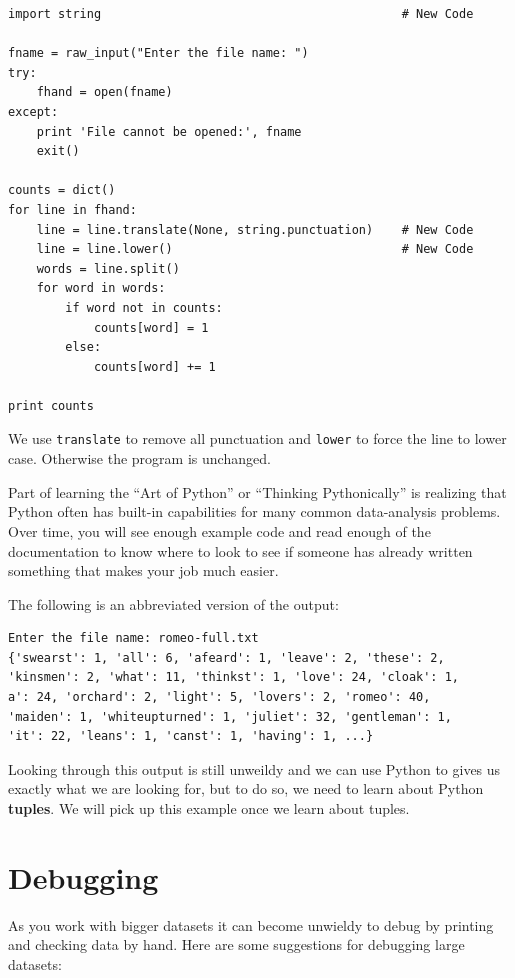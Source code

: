 \documentclass[10pt]{book}
\begin{document}
\beforeverb
\begin{verbatim}
import string                                          # New Code

fname = raw_input("Enter the file name: ")
try:
    fhand = open(fname)
except:
    print 'File cannot be opened:', fname
    exit()

counts = dict()
for line in fhand:
    line = line.translate(None, string.punctuation)    # New Code
    line = line.lower()                                # New Code
    words = line.split()
    for word in words:
        if word not in counts:
            counts[word] = 1
        else:
            counts[word] += 1

print counts
\end{verbatim}
\afterverb
%
We use {\tt translate} to remove all punctuation and {\tt lower} to 
force the line to lower case.  Otherwise the program is unchanged.

Part of learning the ``Art of Python'' or ``Thinking Pythonically''
is realizing that Python
often has built-in capabilities for many common data-analysis
problems.  Over time, you will see enough example code and read
enough of the documentation to know where to look to see if someone
has already written something that makes your job much easier.

The following is an abbreviated version of the output:
\beforeverb
\begin{verbatim}
Enter the file name: romeo-full.txt
{'swearst': 1, 'all': 6, 'afeard': 1, 'leave': 2, 'these': 2, 
'kinsmen': 2, 'what': 11, 'thinkst': 1, 'love': 24, 'cloak': 1, 
a': 24, 'orchard': 2, 'light': 5, 'lovers': 2, 'romeo': 40, 
'maiden': 1, 'whiteupturned': 1, 'juliet': 32, 'gentleman': 1, 
'it': 22, 'leans': 1, 'canst': 1, 'having': 1, ...}
\end{verbatim}
\afterverb
%
Looking through this output is still unweildy and we can use
Python to gives us exactly what we are looking for, but to do 
so, we need to learn about Python {\bf tuples}.  We
will pick up this example once we learn about tuples.

\section{Debugging}

As you work with bigger datasets it can become unwieldy to
debug by printing and checking data by hand.  Here are some
suggestions for debugging large datasets:
\end{document}
